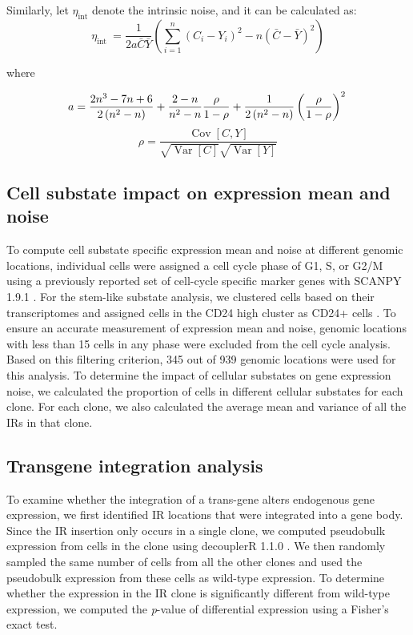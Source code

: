 Similarly, let $\eta_{\text {int}}$ denote the intrinsic noise, and it can be calculated as:
$$
\eta_{\text {int }}=\frac{1}{2 a \bar{C} \bar{Y}}\left(\sum_{i=1}^n\left(C_i-Y_i\right)^2-n(\bar{C}-\bar{Y})^2\right) 
$$
\centerline{where}
$$
a=\frac{2 n^3-7 n+6}{2\left(n^2-n\right)}+\frac{2-n}{n^2-n} \frac{\rho}{1-\rho}+\frac{1}{2\left(n^2-n\right)}\left(\frac{\rho}{1-\rho}\right)^2 \\
$$
$$
\rho=\frac{\operatorname{Cov}[C, Y]}{\sqrt{\operatorname{Var}[C]} \sqrt{\operatorname{Var}[Y]}}
$$

\subsection*{Cell substate impact on expression mean and noise}

To compute cell substate specific expression mean and noise at different genomic locations, individual cells were assigned a cell cycle phase of G1, S, or G2/M using a previously reported set of cell-cycle specific marker genes with SCANPY 1.9.1 \cite{wolffa_theisfj:SCANPYLargescale2018}. For the stem-like substate analysis, we clustered cells based on their transcriptomes and assigned cells in the CD24 high cluster as CD24+ cells \cite{litzenburgerum_changhy:SinglecellEpigenomic2017}. To ensure an accurate measurement of expression mean and noise, genomic locations with less than 15 cells in any phase were excluded from the cell cycle analysis. Based on this filtering criterion, 345 out of 939 genomic locations were used for this analysis. To determine the impact of cellular substates on gene expression noise, we calculated the proportion of cells in different cellular substates for each clone. For each clone, we also calculated the average mean and variance of all the IRs in that clone. 

\subsection*{Transgene integration analysis}

To examine whether the integration of a trans-gene alters endogenous gene expression, we first identified IR locations that were integrated into a gene body. Since the IR insertion only occurs in a single clone, we computed pseudobulk expression from cells in the clone using decouplerR 1.1.0 \cite{badia-i-mompelp_saez-rodriguezj:DecoupleREnsemble2022}. We then randomly sampled the same number of cells from all the other clones and used the pseudobulk expression from these cells as wild-type expression. To determine whether the expression in the IR clone is significantly different from wild-type expression, we computed the \textit{p}-value of differential expression using a Fisher’s exact test. 

